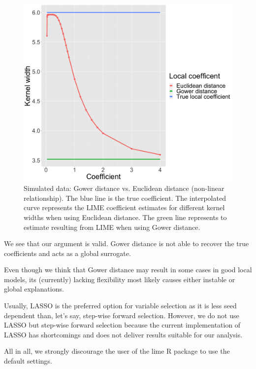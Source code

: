 \documentclass[]{krantz}
\begin{document}
\begin{figure}

{\centering \includegraphics[width=0.99\linewidth]{images/04-09-16} 

}

\caption{Simulated data: Gower distance vs. Euclidean distance (non-linear relationship). The blue line is the true coefficient. The interpolated curve represents the LIME coefficient estimates for different kernel widths when using Euclidean distance. The green line represents to estimate resulting from LIME when using Gower distance.}\label{fig:lime-fig15}
\end{figure}

We see that our argument is valid. Gower distance is not able to recover
the true coefficients and acts as a global surrogate.

Even though we think that Gower distance may result in some cases in
good local models, its (currently) lacking flexibility most likely
causes either instable or global explanations.

Usually, LASSO is the preferred option for variable selection as it is
less seed dependent than, let's say, step-wise forward selection.
However, we do not use LASSO but step-wise forward selection because the
current implementation of LASSO has shortcomings and does not deliver
results suitable for our analysis.

All in all, we strongly discourage the user of the lime R package to use
the default settings.
\end{document}
